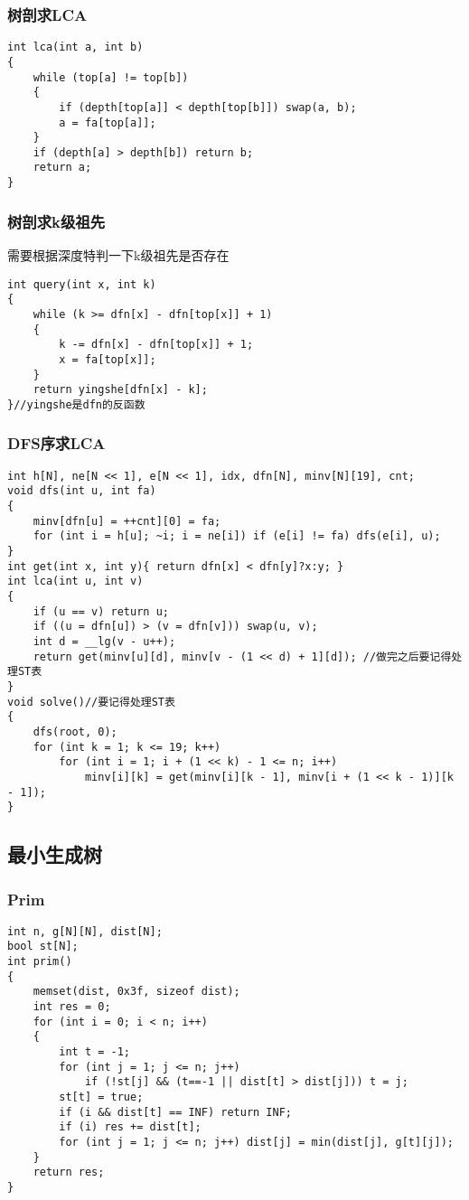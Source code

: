 \documentclass[a4paper,fontset=none]{ctexart}
\begin{document}
\subsubsection{树剖求LCA}
\begin{verbatim}
int lca(int a, int b)
{
    while (top[a] != top[b])
    {
        if (depth[top[a]] < depth[top[b]]) swap(a, b);
        a = fa[top[a]];
    }
    if (depth[a] > depth[b]) return b;
    return a;
}
\end{verbatim}
\subsubsection{树剖求k级祖先}
需要根据深度特判一下k级祖先是否存在
\begin{verbatim}
int query(int x, int k)
{
    while (k >= dfn[x] - dfn[top[x]] + 1)
    {
        k -= dfn[x] - dfn[top[x]] + 1;
        x = fa[top[x]];
    }
    return yingshe[dfn[x] - k];
}//yingshe是dfn的反函数
\end{verbatim}
\subsubsection{DFS序求LCA}
\begin{verbatim}
int h[N], ne[N << 1], e[N << 1], idx, dfn[N], minv[N][19], cnt;
void dfs(int u, int fa)
{
    minv[dfn[u] = ++cnt][0] = fa;
    for (int i = h[u]; ~i; i = ne[i]) if (e[i] != fa) dfs(e[i], u);
}
int get(int x, int y){ return dfn[x] < dfn[y]?x:y; }
int lca(int u, int v)
{
    if (u == v) return u;
    if ((u = dfn[u]) > (v = dfn[v])) swap(u, v);
    int d = __lg(v - u++);
    return get(minv[u][d], minv[v - (1 << d) + 1][d]); //做完之后要记得处理ST表
}
void solve()//要记得处理ST表
{
    dfs(root, 0);
    for (int k = 1; k <= 19; k++)
        for (int i = 1; i + (1 << k) - 1 <= n; i++)
            minv[i][k] = get(minv[i][k - 1], minv[i + (1 << k - 1)][k - 1]);
}
\end{verbatim}
\subsection{最小生成树}
\subsubsection{Prim}
\begin{verbatim}
int n, g[N][N], dist[N];
bool st[N];
int prim()
{
    memset(dist, 0x3f, sizeof dist);
    int res = 0;
    for (int i = 0; i < n; i++)
    {
        int t = -1;
        for (int j = 1; j <= n; j++)
            if (!st[j] && (t==-1 || dist[t] > dist[j])) t = j;
        st[t] = true;
        if (i && dist[t] == INF) return INF;
        if (i) res += dist[t];
        for (int j = 1; j <= n; j++) dist[j] = min(dist[j], g[t][j]);
    }
    return res;
}
\end{verbatim}
\end{document}
